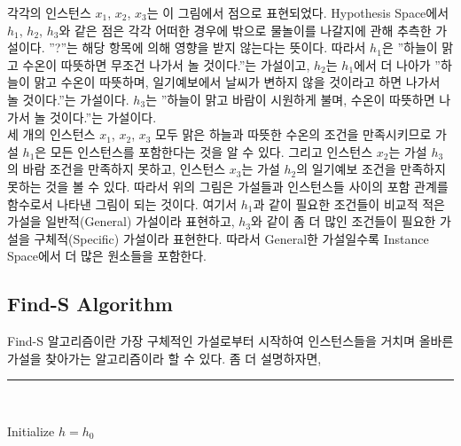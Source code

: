\documentclass[a4paper]{oblivoir}
\begin{document}
\indent 각각의 인스턴스 $x_{1}$, $x_{2}$, $x_{3}$는 이 그림에서 점으로 표현되었다. Hypothesis Space에서 $h_{1}$, $h_{2}$, $h_{3}$와 같은 점은 각각 어떠한 경우에 밖으로 물놀이를 나갈지에 관해 추측한 가설이다. ''?''는 해당 항목에 의해 영향을 받지 않는다는 뜻이다. 따라서 $h_{1}$은 ''하늘이 맑고 수온이 따뜻하면 무조건 나가서 놀 것이다.''는 가설이고, $h_{2}$는 $h_{1}$에서 더 나아가 ''하늘이 맑고 수온이 따뜻하며, 일기예보에서 날씨가 변하지 않을 것이라고 하면 나가서 놀 것이다.''는 가설이다. $h_{3}$는 ''하늘이 맑고 바람이 시원하게 불며, 수온이 따뜻하면 나가서 놀 것이다.''는 가설이다. \\
\indent 세 개의 인스턴스 $x_{1}$, $x_{2}$, $x_{3}$ 모두 맑은 하늘과 따뜻한 수온의 조건을 만족시키므로 가설 $h_{1}$은 모든 인스턴스를 포함한다는 것을 알 수 있다. 그리고 인스턴스 $x_{2}$는 가설  $h_{3}$의 바람 조건을 만족하지 못하고, 인스턴스  $x_{3}$는 가설 $h_{2}$의 일기예보 조건을 만족하지 못하는 것을 볼 수 있다. 따라서 위의 그림은 가설들과 인스턴스들 사이의 포함 관계를 함수로서 나타낸 그림이 되는 것이다. 여기서 $h_{1}$과 같이 필요한 조건들이 비교적 적은 가설을 일반적(General) 가설이라 표현하고, $h_{3}$와 같이 좀 더 많인 조건들이 필요한 가설을 구체적(Specific) 가설이라 표현한다. 따라서 General한 가설일수록 Instance Space에서 더 많은 원소들을 포함한다. \\

\subsection{Find-S Algorithm}
Find-S 알고리즘이란 가장 구체적인 가설로부터 시작하여 인스턴스들을 거치며 올바른 가설을 찾아가는 알고리즘이라 할 수 있다. 좀 더 설명하자면, \\
\indent\rule{10cm}{0.4pt} \\
\begin{algorithm}[H]
	\SetAlgoLined
	Initialize $h = h_{0}$
\end{algorithm}
\end{document}
